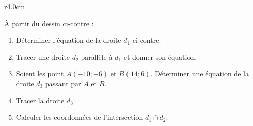 
\begin{exercice}\label{exosmath-0606}

\begin{wrapfigure}{r}{4.0cm}
   \vspace{-1cm}        %
   \centering
   
\end{wrapfigure}

À partir du dessin ci-contre :
\begin{enumerate}
    \item
        Déterminer l'équation de la droite \( d_1\) ci-contre.
    \item
        Tracer une droite \( d_2\) parallèle à \( d_1\) et donner son équation.
    \item
        Soient les point \( A(-10;-6)\) et \( B(14;6)\). Déterminer une équation de la droite \( d_3\) passant par \( A\) et \( B\).
    \item
        Tracer la droite \( d_3\).
    \item
        Calculer les coordonnées de l'intersection \( d_1\cap d_2\).
\end{enumerate}


\end{exercice}
